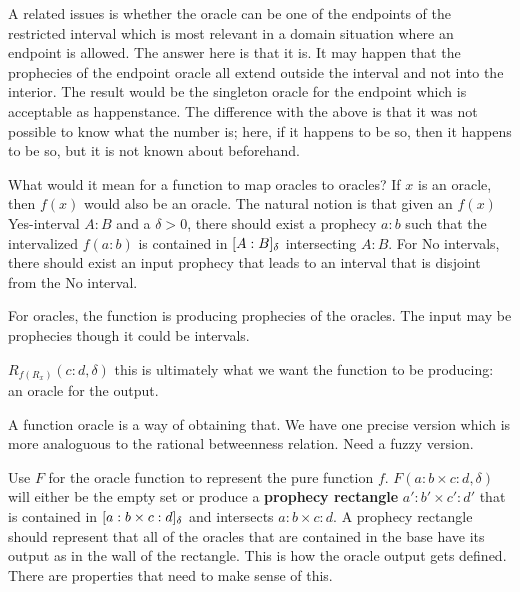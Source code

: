 \documentclass[12pt]{article}
\begin{document}
A related issues is whether the oracle can be one of the endpoints of the restricted interval which is most relevant in a domain situation where an endpoint is allowed. The answer here is that it is. It may happen that the prophecies of the endpoint oracle all extend outside the interval and not into the interior. The result would be the singleton oracle for the endpoint which is acceptable as happenstance. The difference with the above is that it was not possible to know what the number is; here, if it happens to be so, then it happens to be so, but it is not known about beforehand. 

What would it mean for a function to map oracles to oracles? If $x$ is an oracle, then $f(x)$ would also be an oracle. The natural notion is that given an $f(x)$ Yes-interval $A:B$ and a $\delta >0$, there should exist a prophecy $a:b$ such that the intervalized $f(a:b)$ is contained in $[A:B]_{\delta}$ intersecting $A:B$. For No intervals, there should exist an input prophecy that leads to an interval that is disjoint from the No interval. 


For oracles, the function is producing prophecies of the oracles. The input may be prophecies though it could be intervals. 

$R_{f(R_x)}(c:d, \delta)$  this is ultimately what we want the function to be producing: an oracle for the output.  

A function oracle is a way of obtaining that. We have one precise version which is more analoguous to the rational betweenness relation. Need a fuzzy version. 

Use $F$ for the oracle function to represent the pure function $f$. $F(a:b \times c:d, \delta)$ will either be the empty set or produce a \textbf{prophecy rectangle} $a':b' \times c':d'$ that is contained in $[a:b \times c:d]_{\delta}$ and intersects $a:b \times c:d$. A prophecy rectangle should represent that all of the oracles that are contained in the base have its output as in the wall of the rectangle. This is how the oracle output gets defined. There are properties that need to make sense of this. 
\end{document}
